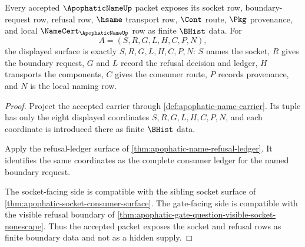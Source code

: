 \begin{theorem}
\label{thm:apophatic-name-socket-carrier}
Every accepted $\ApophaticNameUp$ packet exposes its socket row, boundary-request row, refusal row, $\hsame$ transport row, $\Cont$ route, $\Pkg$ provenance, and local $\NameCert_{\ApophaticNameUp}$ row as finite $\BHist$ data. For
$$
A=(S,R,G,L,H,C,P,N),
$$
the displayed surface is exactly $S,R,G,L,H,C,P,N$: $S$ names the socket, $R$ gives the boundary request, $G$ and $L$ record the refusal decision and ledger, $H$ transports the components, $C$ gives the consumer route, $P$ records provenance, and $N$ is the local naming row.
\end{theorem}
\begin{proof}
Project the accepted carrier through \autoref{def:apophatic-name-carrier}. Its tuple has only the eight displayed coordinates $S,R,G,L,H,C,P,N$, and each coordinate is introduced there as finite $\BHist$ data.

Apply the refusal-ledger surface of \autoref{thm:apophatic-name-refusal-ledger}. It identifies the same coordinates as the complete consumer ledger for the named boundary request.

The socket-facing side is compatible with the sibling socket surface of \autoref{thm:apophatic-socket-consumer-surface}. The gate-facing side is compatible with the visible refusal boundary of \autoref{thm:apophatic-gate-question-visible-socket-nonescape}. Thus the accepted packet exposes the socket and refusal rows as finite boundary data and not as a hidden supply.
\end{proof}

